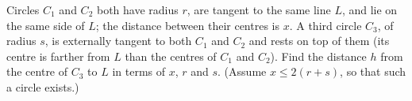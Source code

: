 Circles $C_1$ and $C_2$ both have radius $r$, are tangent to the same line $L$, and lie on the same side of $L$; the distance between their centres is $x$. A third circle $C_3$, of radius $s$, is externally tangent to both $C_1$ and $C_2$ and rests on top of them (its centre is farther from $L$ than the centres of $C_1$ and $C_2$). Find the distance $h$ from the centre of $C_3$ to $L$ in terms of $x$, $r$ and $s$. (Assume $x\le2(r+s)$, so that such a circle exists.)
